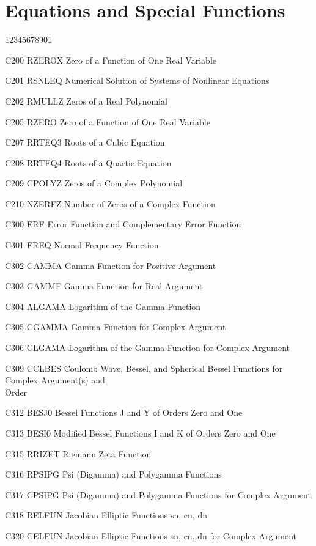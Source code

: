 \section*{Equations and Special Functions}
\begin{DLtt}{12345678901}
\item[C200 RZEROX] Zero of a Function of One Real Variable
\item[C201 RSNLEQ] Numerical Solution of Systems of Nonlinear Equations
\item[C202 RMULLZ] Zeros of a Real Polynomial
\item[C205 RZERO] Zero of a Function of One Real Variable
\item[C207 RRTEQ3] Roots of a Cubic Equation
\item[C208 RRTEQ4] Roots of a Quartic Equation
\item[C209 CPOLYZ] Zeros of a Complex Polynomial
\item[C210 NZERFZ] Number of Zeros of a Complex Function
\item[C300 ERF] Error Function and Complementary Error Function
\item[C301 FREQ] Normal Frequency Function
\item[C302 GAMMA] Gamma Function for Positive Argument
\item[C303 GAMMF] Gamma Function for Real Argument
\item[C304 ALGAMA] Logarithm of the Gamma Function
\item[C305 CGAMMA] Gamma Function for Complex Argument
\item[C306 CLGAMA] Logarithm of the Gamma Function for Complex Argument
\item[C309 CCLBES] Coulomb Wave, Bessel, and Spherical Bessel
Functions for Complex Argument(s) and \\ Order
\item[C312 BESJ0] Bessel Functions J and Y of Orders Zero and One
\item[C313 BESI0] Modified Bessel Functions I and K of Orders
Zero and One
\item[C315 RRIZET] Riemann Zeta Function
\item[C316 RPSIPG] Psi (Digamma) and Polygamma Functions
\item[C317 CPSIPG] Psi (Digamma) and Polygamma Functions for Complex
Argument
\item[C318 RELFUN] Jacobian Elliptic Functions sn, cn, dn
\item[C320 CELFUN] Jacobian Elliptic Functions sn, cn, dn for
Complex Argument

\end{DLtt}

